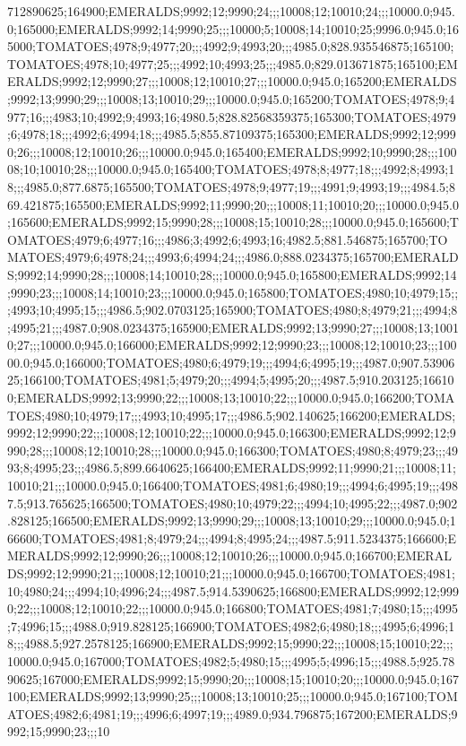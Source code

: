 712890625;164900;EMERALDS;9992;12;9990;24;;;10008;12;10010;24;;;10000.0;945.0;165000;EMERALDS;9992;14;9990;25;;;10000;5;10008;14;10010;25;9996.0;945.0;165000;TOMATOES;4978;9;4977;20;;;4992;9;4993;20;;;4985.0;828.935546875;165100;TOMATOES;4978;10;4977;25;;;4992;10;4993;25;;;4985.0;829.013671875;165100;EMERALDS;9992;12;9990;27;;;10008;12;10010;27;;;10000.0;945.0;165200;EMERALDS;9992;13;9990;29;;;10008;13;10010;29;;;10000.0;945.0;165200;TOMATOES;4978;9;4977;16;;;4983;10;4992;9;4993;16;4980.5;828.82568359375;165300;TOMATOES;4979;6;4978;18;;;4992;6;4994;18;;;4985.5;855.87109375;165300;EMERALDS;9992;12;9990;26;;;10008;12;10010;26;;;10000.0;945.0;165400;EMERALDS;9992;10;9990;28;;;10008;10;10010;28;;;10000.0;945.0;165400;TOMATOES;4978;8;4977;18;;;4992;8;4993;18;;;4985.0;877.6875;165500;TOMATOES;4978;9;4977;19;;;4991;9;4993;19;;;4984.5;869.421875;165500;EMERALDS;9992;11;9990;20;;;10008;11;10010;20;;;10000.0;945.0;165600;EMERALDS;9992;15;9990;28;;;10008;15;10010;28;;;10000.0;945.0;165600;TOMATOES;4979;6;4977;16;;;4986;3;4992;6;4993;16;4982.5;881.546875;165700;TOMATOES;4979;6;4978;24;;;4993;6;4994;24;;;4986.0;888.0234375;165700;EMERALDS;9992;14;9990;28;;;10008;14;10010;28;;;10000.0;945.0;165800;EMERALDS;9992;14;9990;23;;;10008;14;10010;23;;;10000.0;945.0;165800;TOMATOES;4980;10;4979;15;;;4993;10;4995;15;;;4986.5;902.0703125;165900;TOMATOES;4980;8;4979;21;;;4994;8;4995;21;;;4987.0;908.0234375;165900;EMERALDS;9992;13;9990;27;;;10008;13;10010;27;;;10000.0;945.0;166000;EMERALDS;9992;12;9990;23;;;10008;12;10010;23;;;10000.0;945.0;166000;TOMATOES;4980;6;4979;19;;;4994;6;4995;19;;;4987.0;907.5390625;166100;TOMATOES;4981;5;4979;20;;;4994;5;4995;20;;;4987.5;910.203125;166100;EMERALDS;9992;13;9990;22;;;10008;13;10010;22;;;10000.0;945.0;166200;TOMATOES;4980;10;4979;17;;;4993;10;4995;17;;;4986.5;902.140625;166200;EMERALDS;9992;12;9990;22;;;10008;12;10010;22;;;10000.0;945.0;166300;EMERALDS;9992;12;9990;28;;;10008;12;10010;28;;;10000.0;945.0;166300;TOMATOES;4980;8;4979;23;;;4993;8;4995;23;;;4986.5;899.6640625;166400;EMERALDS;9992;11;9990;21;;;10008;11;10010;21;;;10000.0;945.0;166400;TOMATOES;4981;6;4980;19;;;4994;6;4995;19;;;4987.5;913.765625;166500;TOMATOES;4980;10;4979;22;;;4994;10;4995;22;;;4987.0;902.828125;166500;EMERALDS;9992;13;9990;29;;;10008;13;10010;29;;;10000.0;945.0;166600;TOMATOES;4981;8;4979;24;;;4994;8;4995;24;;;4987.5;911.5234375;166600;EMERALDS;9992;12;9990;26;;;10008;12;10010;26;;;10000.0;945.0;166700;EMERALDS;9992;12;9990;21;;;10008;12;10010;21;;;10000.0;945.0;166700;TOMATOES;4981;10;4980;24;;;4994;10;4996;24;;;4987.5;914.5390625;166800;EMERALDS;9992;12;9990;22;;;10008;12;10010;22;;;10000.0;945.0;166800;TOMATOES;4981;7;4980;15;;;4995;7;4996;15;;;4988.0;919.828125;166900;TOMATOES;4982;6;4980;18;;;4995;6;4996;18;;;4988.5;927.2578125;166900;EMERALDS;9992;15;9990;22;;;10008;15;10010;22;;;10000.0;945.0;167000;TOMATOES;4982;5;4980;15;;;4995;5;4996;15;;;4988.5;925.7890625;167000;EMERALDS;9992;15;9990;20;;;10008;15;10010;20;;;10000.0;945.0;167100;EMERALDS;9992;13;9990;25;;;10008;13;10010;25;;;10000.0;945.0;167100;TOMATOES;4982;6;4981;19;;;4996;6;4997;19;;;4989.0;934.796875;167200;EMERALDS;9992;15;9990;23;;;10
